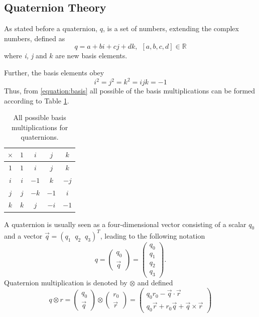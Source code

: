 \documentclass{LTHthesis}
\begin{document}
\subsection{Quaternion Theory}
%
As stated before a quaternion, $q$, is a set of numbers, extending the complex numbers, defined as
%
\begin{equation}
q = a+bi+cj+dk, \hspace{5pt}[a,b,c,d]\in \mathbb R
\end{equation} 
%
where \emph{i, j} and $k$ are new basis elements.

Further, the basis elements obey
%
\begin{equation}
\label{equation:basis}
i^2=j^2=k^2=ijk=-1
\end{equation}
%
Thus, from \ref{equation:basis} all possible of the basis multiplications can be formed according to Table \ref{table:basis}.
%
\begin{table}[!hbt]
\begin{center}
\begin{tabular}{|c|c|c|c|c|}
\hline
$\times$ & $1$ & $i$ & $j$ & $k$ \\
\hline
$1$ & $1$ & $i$ & $j$ & $k$ \\
\hline 
$i$ & $i$ & $-1$ & $k$ & $-j$\\
\hline
$j$ & $j$ & $-k$ & $-1$ & $i$ \\
\hline
$k$ & $k$ & $j$ & $-i$ & $-1$ \\
\hline
\end{tabular}
\end{center}
\caption{All possible basis multiplications for quaternions.}
\label{table:basis}
\end{table}
%
A quaternion is usually seen as a four-dimensional vector consisting of a scalar $q_0$ and a vector $\vec{q} = (q_1 \; \; q_2 \; \; q_3)^T$, leading to the following notation
%
\begin{equation}
q = \left(\begin{array}{c}q_0\\ \vec{q}\end{array}\right) = \left(\begin{array}{c}q_0\\ q_1 \\ q_2 \\ q_3\end{array}\right). 
\end{equation}  
%
Quaternion multiplication is denoted by $\otimes$ and defined 
%
\begin{equation}
q\otimes r = \left(\begin{array}{c}q_0\\ \vec{q}\end{array}\right) \otimes \left(\begin{array}{c}r_0\\ \vec{r}\end{array}\right) =
\left(\begin{array}{c}q_0r_0-\vec{q} \cdot \vec{r}\\ q_0\vec{r}+r_0\vec{q}+\vec{q}\times \vec{r}\end{array}\right)
\end{equation}
\end{document}

